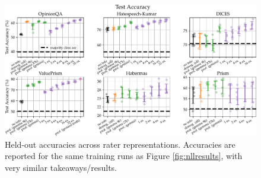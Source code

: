 \documentclass[11pt]{article}
\begin{document}
\begin{figure}[h]
\centering
\includegraphics[width=\textwidth]{files/first_acc.pdf}
\caption{Held-out accuracies across rater representations. Accuracies are reported for the same training runs as Figure \ref{fig:nllresults}, with very similar takeaways/results.} 
\label{fig:accresults}
\end{figure}
\end{document}
